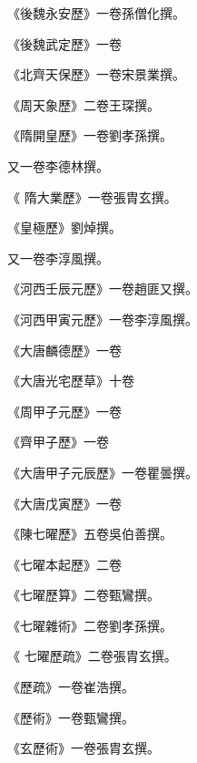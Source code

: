 \begin{pinyinscope}
 《後魏永安歷》一卷孫僧化撰。



 《後魏武定歷》一卷



 《北齊天保歷》一卷宋景業撰。



 《周天象歷》二卷王琛撰。



 《隋開皇歷》一卷劉孝孫撰。



 又一卷李德林撰。



 《
 隋大業歷》一卷張胄玄撰。



 《皇極歷》劉焯撰。



 又一卷李淳風撰。



 《河西壬辰元歷》一卷趙匪又撰。



 《河西甲寅元歷》一卷李淳風撰。



 《大唐麟德歷》一卷



 《大唐光宅歷草》十卷



 《周甲子元歷》一卷



 《齊甲子歷》一卷



 《大唐甲子元辰歷》一卷瞿曇撰。



 《大唐戊寅歷》一卷



 《陳七曜歷》五卷吳伯善撰。



 《七曜本起歷》二卷



 《七曜歷算》二卷甄鸞撰。



 《七曜雜術》二卷劉孝孫撰。



 《
 七曜歷疏》二卷張胄玄撰。



 《歷疏》一卷崔浩撰。



 《歷術》一卷甄鸞撰。



 《玄歷術》一卷張胄玄撰。




\end{pinyinscope}
